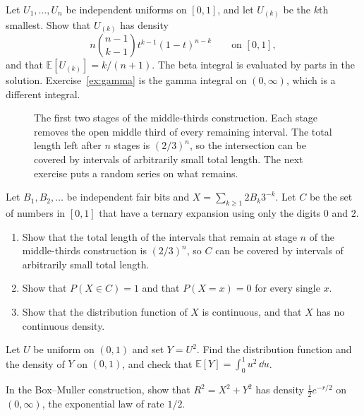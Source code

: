 \begin{exercise}[$\star\star$]\label{ex:order}
Let $U_1,\ldots,U_n$ be independent uniforms on $[0,1]$, and let $U_{(k)}$ be the $k$th smallest. Show that $U_{(k)}$ has density
\[
 n\binom{n-1}{k-1}t^{k-1}(1-t)^{n-k}\qquad\text{on }[0,1],
\]
and that $\mathbb E[U_{(k)}]=k/(n+1)$. The beta integral is evaluated by parts in the solution. Exercise~\ref{ex:gamma} is the gamma integral on $(0,\infty)$, which is a different integral.
\end{exercise}

\begin{figure}[ht]
\centering
{}
\caption{The first two stages of the middle-thirds construction. Each stage removes the open middle third of every remaining interval. The total length left after $n$ stages is $(2/3)^n$, so the intersection can be covered by intervals of arbitrarily small total length. The next exercise puts a random series on what remains.}
\label{fig:cantor}
\end{figure}

\begin{exercise}[$\star\star$]\label{ex:cantor}
Let $B_1,B_2,\ldots$ be independent fair bits and $X=\sum_{k\ge1}2B_k 3^{-k}$. Let $C$ be the set of numbers in $[0,1]$ that have a ternary expansion using only the digits $0$ and $2$.
\begin{enumerate}[label=(\alph*)]
\item Show that the total length of the intervals that remain at stage $n$ of the middle-thirds construction is $(2/3)^n$, so $C$ can be covered by intervals of arbitrarily small total length.
\item Show that $P(X\in C)=1$ and that $P(X=x)=0$ for every single $x$.
\item Show that the distribution function of $X$ is continuous, and that $X$ has no continuous density.
\end{enumerate}
\end{exercise}

\begin{exercise}[$\star\star$]\label{ex:usquare}
Let $U$ be uniform on $(0,1)$ and set $Y=U^2$. Find the distribution function and the density of $Y$ on $(0,1)$, and check that $\mathbb E[Y]=\int_0^1 u^2\,\dd u$.
\end{exercise}

\begin{exercise}[$\star$]\label{ex:radius}
In the Box--Muller construction, show that $R^2=X^2+Y^2$ has density $\tfrac12 e^{-r/2}$ on $(0,\infty)$, the exponential law of rate $1/2$.
\end{exercise}


